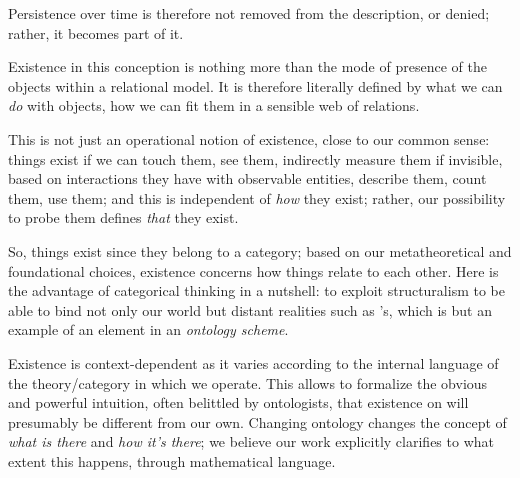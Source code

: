 Persistence over time is therefore not removed from the description, or denied; rather, it becomes part of it.

Existence in this conception is nothing more than the mode of presence of the objects within a relational model. It is therefore literally defined by what we can \emph{do} with objects, how we can fit them in a sensible web of relations.

This is not just an operational notion of existence, close to our common sense: things exist if we can touch them, see them, indirectly measure them if invisible, based on interactions they have with observable entities, describe them, count them, use them; and this is independent of \emph{how} they exist; rather, our possibility to probe them defines \emph{that} they exist.

So, things exist since they belong to a category; based on our metatheoretical and foundational choices, existence concerns how things relate to each other. Here is the advantage of categorical thinking in a nutshell: to exploit structuralism to be able to bind not only our world but distant realities such as \tlon's, which is but an example of an element in an \emph{ontology scheme}.

Existence is context-dependent as it varies according to the internal language of the theory/category in which we operate. This allows to formalize the obvious and powerful intuition, often belittled by ontologists, that existence on \tlon will presumably be different from our own. Changing ontology changes the concept of \emph{what is there} and \emph{how it's there}; we believe our work explicitly clarifies to what extent this happens, through mathematical language.
